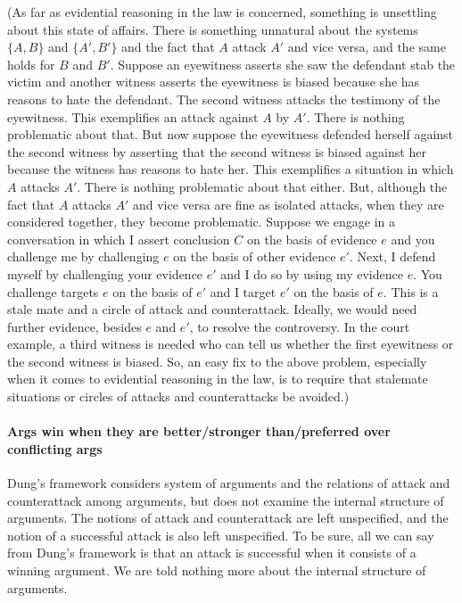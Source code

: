 \documentclass[10pt]{article}
\begin{document}
(As far as evidential reasoning in the law is concerned, something is unsettling about this state of affairs. There is something unnatural about the systems $\{A, B\}$ and $\{A', B'\}$ and the fact that $A$ attack $A'$ and vice versa, and the same holds for $B$ and $B'$.
Suppose an eyewitness asserts she saw the defendant stab the victim and another witness asserts the eyewitness is biased because she has reasons to hate the defendant. The second witness attacks the testimony of the eyewitness. This exemplifies an attack against $A$ by $A'$. There is nothing problematic about that. But now suppose the eyewitness defended herself against the second witness by asserting that the second witness is biased against her because the witness has reasons to hate her. This exemplifies a situation in which $A$ attacks $A'$. There is nothing problematic about that either. But, although the fact that $A$ attacks $A'$ and vice versa are fine as isolated attacks, when they are considered together, they become  problematic. Suppose we engage in a conversation in which I assert conclusion $C$ on the basis of evidence $e$  and you challenge me by challenging $e$ on the basis of other evidence $e'$. Next, I defend myself by challenging your evidence $e'$ and I do so by using my evidence $e$.  You challenge targets $e$ on the basis of $e'$ and I target $e'$ on the basis of $e$. This is a stale mate and a circle of attack and counterattack. Ideally, we would need further evidence, besides $e$ and $e'$, to resolve the controversy. In the court example,  a third witness is needed who can tell us whether the first eyewitness or the second witness is biased. So, an easy fix to the above problem, especially when it comes to evidential reasoning in the law, is to require that stalemate situations or circles of attacks and counterattacks be avoided.)

\paragraph{Args win when they are better/stronger than/preferred over conflicting args}

Dung's framework considers system of arguments and the relations of attack and counterattack among arguments, but does not examine the internal structure of arguments. The notions of attack and counterattack are left unspecified, and the notion of a successful 
attack is also left unspecified. To be sure, all we can say from Dung's framework is that an attack is successful when 
it consists of a winning argument. We are told nothing more about the internal structure of arguments.
\end{document}

